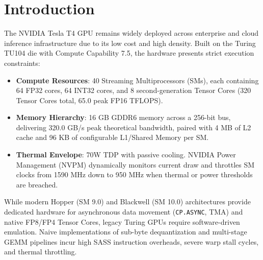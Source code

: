 \documentclass[10pt,twocolumn,letterpaper]{article}
\begin{document}
\section{Introduction}
The NVIDIA Tesla T4 GPU remains widely deployed across enterprise and cloud inference infrastructure due to its low cost and high density. Built on the Turing TU104 die with Compute Capability 7.5, the hardware presents strict execution constraints:
\begin{itemize}
  \item \textbf{Compute Resources}: 40 Streaming Multiprocessors (SMs), each containing 64 FP32 cores, 64 INT32 cores, and 8 second-generation Tensor Cores (320 Tensor Cores total, 65.0 peak FP16 TFLOPS).
  \item \textbf{Memory Hierarchy}: 16 GB GDDR6 memory across a 256-bit bus, delivering 320.0 GB/s peak theoretical bandwidth, paired with 4 MB of L2 cache and 96 KB of configurable L1/Shared Memory per SM.
  \item \textbf{Thermal Envelope}: 70W TDP with passive cooling. NVIDIA Power Management (NVPM) dynamically monitors current draw and throttles SM clocks from 1590 MHz down to 950 MHz when thermal or power thresholds are breached.
\end{itemize}

While modern Hopper (SM 9.0) and Blackwell (SM 10.0) architectures provide dedicated hardware for asynchronous data movement (\texttt{CP.ASYNC}, TMA) and native FP8/FP4 Tensor Cores, legacy Turing GPUs require software-driven emulation. Naive implementations of sub-byte dequantization and multi-stage GEMM pipelines incur high SASS instruction overheads, severe warp stall cycles, and thermal throttling.
\end{document}
